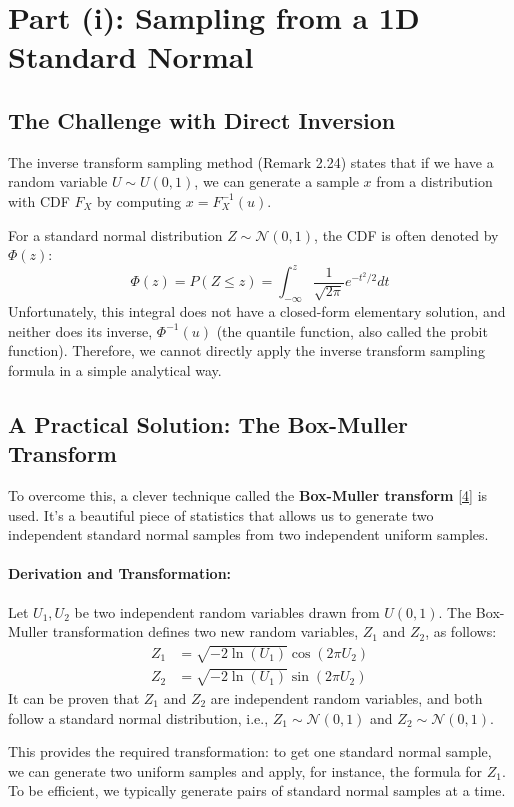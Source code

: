 \documentclass[11pt,a4paper]{article}
\newcommand{\N}{\mathcal{N}}
\begin{document}
\section{Part (i): Sampling from a 1D Standard Normal}

\subsection{The Challenge with Direct Inversion}
The inverse transform sampling method (Remark 2.24) states that if we have a random variable $U \sim U(0,1)$, we can generate a sample $x$ from a distribution with CDF $F_X$ by computing $x = F_X^{-1}(u)$.

For a standard normal distribution $Z \sim \N(0,1)$, the CDF is often denoted by $\Phi(z)$:
\[ \Phi(z) = P(Z \le z) = \int_{-\infty}^{z} \frac{1}{\sqrt{2\pi}} e^{-t^2/2} dt \]
Unfortunately, this integral does not have a closed-form elementary solution, and neither does its inverse, $\Phi^{-1}(u)$ (the quantile function, also called the probit function). Therefore, we cannot directly apply the inverse transform sampling formula in a simple analytical way.

\subsection{A Practical Solution: The Box-Muller Transform}
To overcome this, a clever technique called the \textbf{Box-Muller transform} \hyperlink{concept:boxmuller}{[4]} is used. It's a beautiful piece of statistics that allows us to generate two independent standard normal samples from two independent uniform samples.

\paragraph{Derivation and Transformation:}
Let $U_1, U_2$ be two independent random variables drawn from $U(0,1)$. The Box-Muller transformation defines two new random variables, $Z_1$ and $Z_2$, as follows:
\begin{align}
    Z_1 &= \sqrt{-2 \ln(U_1)} \cos(2\pi U_2) \\
    Z_2 &= \sqrt{-2 \ln(U_1)} \sin(2\pi U_2)
\end{align}
It can be proven that $Z_1$ and $Z_2$ are independent random variables, and both follow a standard normal distribution, i.e., $Z_1 \sim \N(0,1)$ and $Z_2 \sim \N(0,1)$.

This provides the required transformation: to get one standard normal sample, we can generate two uniform samples and apply, for instance, the formula for $Z_1$. To be efficient, we typically generate pairs of standard normal samples at a time.
\end{document}
